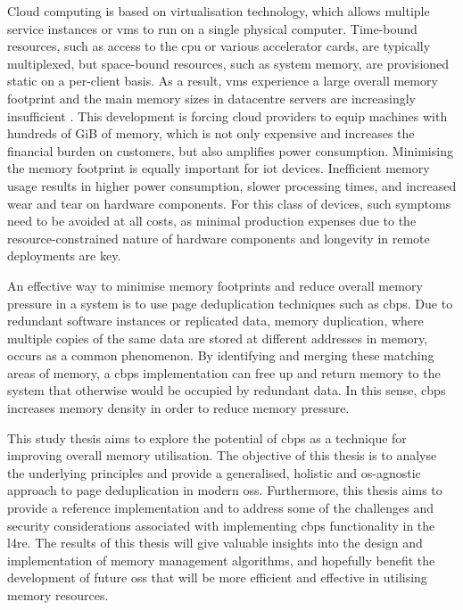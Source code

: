 Cloud computing is based on virtualisation technology, which allows multiple service instances or \acp{vm} to run on a single physical computer.
Time-bound resources, such as access to the \ac{cpu} or various accelerator cards, are typically multiplexed, but space-bound resources, such as system memory, are provisioned static on a per-client basis.
As a result, \acp{vm} experience a large overall memory footprint and the main memory sizes in datacentre servers are increasingly insufficient \cite{pm2019}.
This development is forcing cloud providers to equip machines with hundreds of GiB of memory, which is not only expensive and increases the financial burden on customers, but also amplifies power consumption.
Minimising the memory footprint is equally important for \Ac{iot} devices.
Inefficient memory usage results in higher power consumption, slower processing times, and increased wear and tear on hardware components.
For this class of devices, such symptoms need to be avoided at all costs, as minimal production expenses due to the resource-constrained nature of hardware components and longevity in remote deployments are key.

An effective way to minimise memory footprints and reduce overall memory pressure in a system is to use page deduplication techniques such as \acf{cbps}.
Due to redundant software instances or replicated data, memory duplication, where multiple copies of the same data are stored at different addresses in memory, occurs as a common phenomenon.
By identifying and merging these matching areas of memory, a \ac{cbps} implementation can free up and return memory to the system that otherwise would be occupied by redundant data.
In this sense, \ac{cbps} increases memory density in order to reduce memory pressure.

This study thesis aims to explore the potential of \ac{cbps} as a technique for improving overall memory utilisation.
The objective of this thesis is to analyse the underlying principles and provide a generalised, holistic and \ac{os}-agnostic approach to page deduplication in modern \acp{os}.
Furthermore, this thesis aims to provide a reference implementation and to address some of the challenges and security considerations associated with implementing \ac{cbps} functionality in the \acl{l4re}.
The results of this thesis will give valuable insights into the design and implementation of memory management algorithms, and hopefully benefit the development of future \acp{os} that will be more efficient and effective in utilising memory resources.
